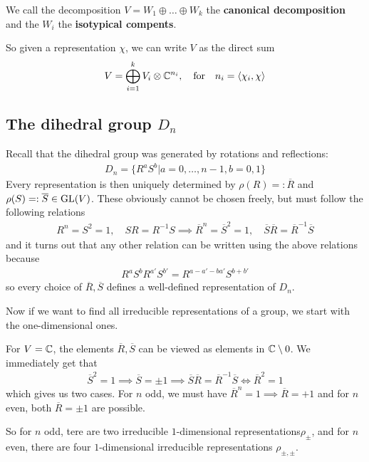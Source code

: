 We call the decomposition $V = W_{1}\oplus \ldots \oplus W_{k}$ the \textbf{canonical decomposition} and the $W_i$ the \textbf{isotypical compents}.

So given a representation $\chi$, we can write $V$ as the direct sum
\begin{align*}
  V = \bigoplus_{i=1}^{k}V_i \otimes \mathbb{C}^{n_i}, \quad \text{for} \quad n_i = \langle\chi_i,\chi\rangle
\end{align*}

\subsection{The dihedral group $D_n$}

Recall that the dihedral group was generated by rotations and reflections:
\begin{align*}
  D_n = \{R^{a}S^{b} \big\vert a = 0, \ldots, n-1, b=0,1\}
\end{align*}
Every representation is then uniquely determined by $\rho(R) =: \overline{R}$ and $\rho(S)=: \overline{S}\in \operatorname{GL}(V)$.
These obviously cannot be chosen freely, but must follow the following relations
\begin{align*}
  R^{n} = S^{2} = 1, \quad SR = R^{-1}S \implies \overline{R}^{n} = \overline{S}^{2} = 1, \quad \overline{S}\overline{R} = \overline{R}^{-1}\overline{S}
\end{align*}
and it turns out that any other relation can be written using the above relations because
\begin{align*}
  R^{a}S^{b}R^{a'}S^{b'} = R^{a - a'-ba'}S^{b+b'}
\end{align*}
so every choice of $\overline{R},\overline{S}$ defines a well-defined representation of $D_n$.

Now if we want to find all irreducible representations of a group, we start with the one-dimensional ones.

For $V = \mathbb{C}$, the elements $\overline{R},\overline{S}$ can be viewed as elements in $\mathbb{C} \setminus 0$.
We immediately get that
\begin{align*}
  \overline{S}^{2} = 1 \implies \overline{S} = \pm 1 \implies \overline{S}\overline{R} = \overline{R}^{-1}\overline{S} \iff \overline{R}^{2} = 1
\end{align*}
which gives us two cases. For $n$ odd, we must have $\overline{R}^{n} = 1 \implies \overline{R} = +1$ and for $n$ even, both $\overline{R} = \pm 1$ are possible.

So for $n$ odd, tere are two irreducible $1$-dimensional representations$\rho_{\pm}$, and for $n$ even, there are four $1$-dimensional irreducible representations $\rho_{\pm,\pm}$.



